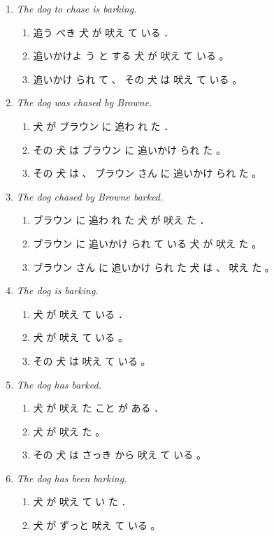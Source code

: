 \documentclass[a4paper,landscape,headrule,footrule,dvips]{foils}
\begin{document}
\begin{CJK}{UTF8}{min}
\begin{enumerate}
\item \textit{The dog to chase is barking.}
  \begin{enumerate}
  \item 追う べき 犬 が 吠え て いる ．
  \item 追いかけよ う と する 犬 が 吠え て いる 。
  \item 追いかけ られ て 、 その 犬 は 吠え て いる 。 
  \end{enumerate}
\item \textit{The dog was chased by Browne.}
  \begin{enumerate}
  \item 犬 が ブラウン に 追わ れ た ．
  \item その 犬 は ブラウン に 追いかけ られ た 。
  \item その 犬 は 、 ブラウン さん に 追いかけ られ た 。
  \end{enumerate}
\newpage
\item \textit{The dog chased by Browne barked.}
  \begin{enumerate}
  \item ブラウン に 追わ れ た 犬 が 吠え た ．
  \item ブラウン に 追いかけ られ て いる 犬 が 吠え た 。
  \item ブラウン さん に 追いかけ られ た 犬 は 、 吠え た 。 
  \end{enumerate}
\item \textit{The dog is barking.}
  \begin{enumerate}
  \item 犬 が 吠え て いる ．
  \item 犬 が 吠え て いる 。
  \item その 犬 は 吠え て いる 。 
  \end{enumerate}
\item \textit{The dog has barked.}
  \begin{enumerate}
  \item 犬 が 吠え た こと が ある ．
  \item 犬 が 吠え た 。
  \item その 犬 は さっき から 吠え て いる 。 
  \end{enumerate}
\item \textit{The dog has been barking.}
  \begin{enumerate}
  \item 犬 が 吠え て い た ．
  \item 犬 が ずっと 吠え て いる 。

\end{enumerate}
\end{enumerate}
\end{CJK}
\end{document}
